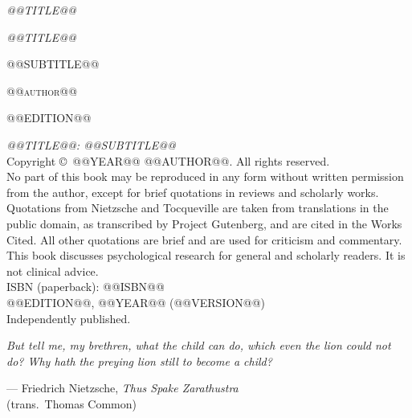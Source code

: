 \frontmatter
\pagestyle{empty}

\begin{center}
\vspace*{2.2in}
{\Large\itshape @@TITLE@@\par}
\end{center}
\cleardoublepage

\begin{center}
\vspace*{1.4in}
{\Huge\itshape @@TITLE@@\par}
\vspace{0.35in}
{\large @@SUBTITLE@@\par}
\vspace{1.6in}
{\large\textsc{\MakeLowercase{@@AUTHOR@@}}\par}
\vfill
{\small @@EDITION@@\par}
\end{center}
\clearpage

{\footnotesize\raggedright
\vspace*{\fill}
\textit{@@TITLE@@: @@SUBTITLE@@}\\[0.6em]
Copyright \copyright\ @@YEAR@@ @@AUTHOR@@. All rights reserved.\\[0.6em]
No part of this book may be reproduced in any form without written permission from the author, except for brief quotations in reviews and scholarly works.\\[0.6em]
Quotations from Nietzsche and Tocqueville are taken from translations in the public domain, as transcribed by Project Gutenberg, and are cited in the Works Cited. All other quotations are brief and are used for criticism and commentary.\\[0.6em]
This book discusses psychological research for general and scholarly readers. It is not clinical advice.\\[0.6em]
ISBN (paperback): @@ISBN@@\\[0.6em]
@@EDITION@@, @@YEAR@@ (@@VERSION@@)\\[0.6em]
Independently published.\par}
\clearpage

\vspace*{2.4in}
\begin{flushright}
\begin{minipage}{0.72\textwidth}
\itshape
But tell me, my brethren, what the child can do, which even the lion could not do? Why hath the preying lion still to become a child?\par
\vspace{0.6em}
\upshape\small\raggedleft--- Friedrich Nietzsche, \textit{Thus Spake Zarathustra}\\(trans.\ Thomas Common)\par
\end{minipage}
\end{flushright}
\cleardoublepage

